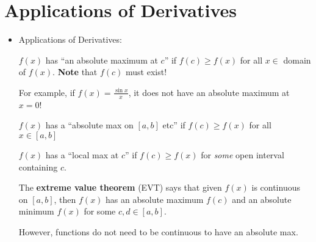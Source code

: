 \section{Applications of Derivatives}
\begin{itemize}
    \item Applications of Derivatives:
    \begin{definition}
        $f(x)$ has ``an absolute maximum at $c$'' if $f(c) \ge f(x)$ for all $x\in$ domain of $f(x)$. \textbf{Note} that $f(c)$ must exist!
        \vspace{2mm}

        For example, if $f(x) = \frac{\sin x}{x}$, it does not have an absolute maximum at $x=0$!

        \begin{center}
        \end{center}
    \end{definition}
    \begin{definition}
        $f(x)$ has a ``absolute max on $[a,b]$ etc'' if $f(c) \ge f(x)$ for all $x\in[a,b]$
    \end{definition}
    \begin{definition}
        $f(x)$ has a ``local max at $c$'' if $f(c) \ge f(x)$ for \textit{some} open interval containing $c$.
    \end{definition}
    \begin{theorem}
        The \textbf{extreme value theorem} (EVT) says that given $f(x)$ is continuous on $[a,b]$, then $f(x)$ has an absolute maximum $f(c)$ and an absolute minimum $f(x)$ for some $c,d \in [a,b]$.
        \vspace{2mm}

        However, functions do not need to be continuous to have an absolute max.


\end{theorem}
\end{itemize}
